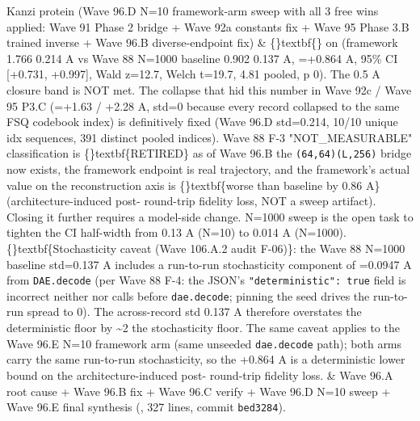 \documentclass{article}
\begin{document}
\begin{table}[ht]
Kanzi protein (Wave 96.D N=10 framework-arm sweep with all 3 free wins applied: Wave 91 Phase 2 bridge + Wave 92a constants fix + Wave 95 Phase 3.B trained  inverse + Wave 96.B diverse-endpoint fix) & \{\}textbf\{\} on  (framework 1.766  0.214 A vs Wave 88 N=1000 baseline 0.902  0.137 A, =+0.864 A, 95\% CI [+0.731, +0.997], Wald z=12.7, Welch t=19.7, 4.81 pooled, p  0). The 0.5 A closure band is NOT met. The collapse that hid this number in Wave 92c / Wave 95 P3.C (=+1.63 / +2.28 A, std=0 because every record collapsed to the same FSQ codebook index) is definitively fixed (Wave 96.D std=0.214, 10/10 unique idx sequences, 391 distinct pooled indices). Wave 88 F-3 "NOT\_MEASURABLE" classification is \{\}textbf\{RETIRED\} as of Wave 96.B  the \texttt{(64,64)(L,256)} bridge now exists, the framework endpoint is real  trajectory, and the framework's actual value on the reconstruction axis is \{\}textbf\{worse than baseline by 0.86 A\} (architecture-induced post- round-trip fidelity loss, NOT a sweep artifact). Closing it further requires a model-side change. N=1000 sweep is the open task to tighten the CI half-width from 0.13 A (N=10) to 0.014 A (N=1000). \{\}textbf\{Stochasticity caveat (Wave 106.A.2 audit F-06)\}: the Wave 88 N=1000 baseline std=0.137 A includes a run-to-run stochasticity component of =0.0947 A from \texttt{DAE.decode} (per Wave 88 F-4: the JSON's \texttt{"deterministic": true} field is incorrect  neither  nor  calls  before \texttt{dae.decode}; pinning the seed drives the run-to-run spread to 0). The across-record std 0.137 A therefore overstates the deterministic floor by \textasciitilde{}2 the stochasticity floor. The same caveat applies to the Wave 96.E N=10 framework arm (same unseeded \texttt{dae.decode} path); both arms carry the same run-to-run stochasticity, so the +0.864 A  is a deterministic lower bound on the architecture-induced post- round-trip fidelity loss. & Wave 96.A root cause + Wave 96.B fix + Wave 96.C verify + Wave 96.D N=10 sweep + Wave 96.E final synthesis (, 327 lines, commit \texttt{bed3284}). \\

\end{table}
\end{document}
